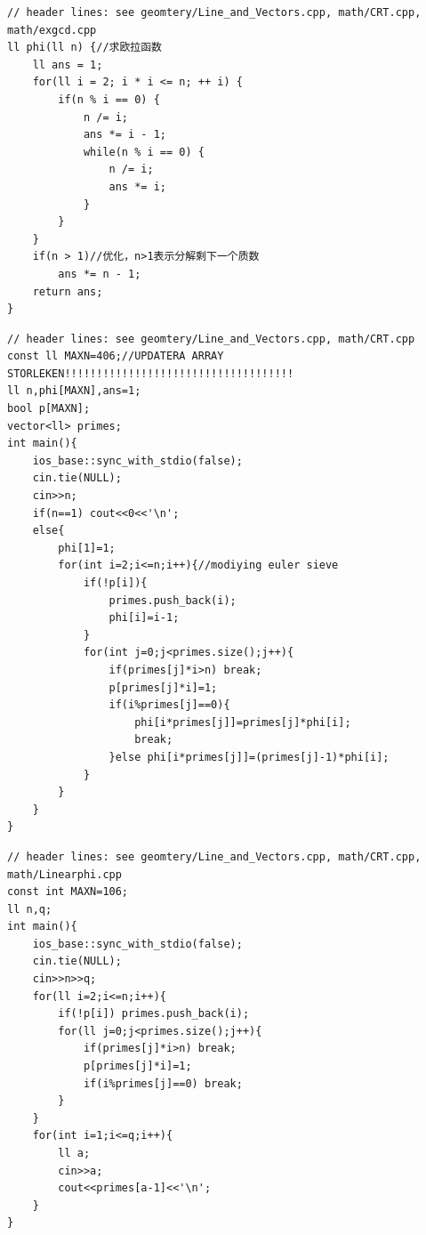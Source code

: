 \begin{lstlisting}[breaklines=true]
// header lines: see geomtery/Line_and_Vectors.cpp, math/CRT.cpp, math/exgcd.cpp
ll phi(ll n) {//求欧拉函数
    ll ans = 1;
    for(ll i = 2; i * i <= n; ++ i) {
        if(n % i == 0) {
            n /= i;
            ans *= i - 1;
            while(n % i == 0) {
                n /= i;
                ans *= i;
            }
        }
    }
    if(n > 1)//优化，n>1表示分解剩下一个质数
        ans *= n - 1;
    return ans;
}
\end{lstlisting}


\begin{lstlisting}[breaklines=true]
// header lines: see geomtery/Line_and_Vectors.cpp, math/CRT.cpp
const ll MAXN=406;//UPDATERA ARRAY STORLEKEN!!!!!!!!!!!!!!!!!!!!!!!!!!!!!!!!!!!!
ll n,phi[MAXN],ans=1;
bool p[MAXN];
vector<ll> primes;
int main(){
    ios_base::sync_with_stdio(false);
    cin.tie(NULL);
    cin>>n;
    if(n==1) cout<<0<<'\n';
    else{
        phi[1]=1;
        for(int i=2;i<=n;i++){//modiying euler sieve
            if(!p[i]){
                primes.push_back(i);
                phi[i]=i-1;
            }
            for(int j=0;j<primes.size();j++){
                if(primes[j]*i>n) break;
                p[primes[j]*i]=1;
                if(i%primes[j]==0){
                    phi[i*primes[j]]=primes[j]*phi[i];
                    break;
                }else phi[i*primes[j]]=(primes[j]-1)*phi[i];
            }
        }
    }
}
\end{lstlisting}


\begin{lstlisting}[breaklines=true]
// header lines: see geomtery/Line_and_Vectors.cpp, math/CRT.cpp, math/Linearphi.cpp
const int MAXN=106;
ll n,q;
int main(){
    ios_base::sync_with_stdio(false);
    cin.tie(NULL);
    cin>>n>>q;
    for(ll i=2;i<=n;i++){
        if(!p[i]) primes.push_back(i);
        for(ll j=0;j<primes.size();j++){
            if(primes[j]*i>n) break;
            p[primes[j]*i]=1;
            if(i%primes[j]==0) break;
        }
    }
    for(int i=1;i<=q;i++){
        ll a;
        cin>>a;
        cout<<primes[a-1]<<'\n';
    }
}
\end{lstlisting}

